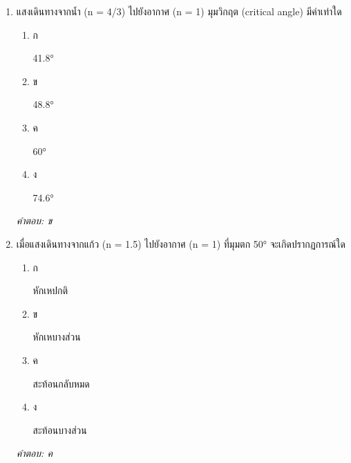 \documentclass[12pt]{article}
\begin{document}
\begin{enumerate}[label=\arabic*., itemsep=0.5\baselineskip, topsep=0.5\baselineskip, leftmargin=*]
\item แสงเดินทางจากน้ำ (n = 4/3) ไปยังอากาศ (n = 1) มุมวิกฤต (critical angle) มีค่าเท่าใด
\begin{enumerate}[label=\alph*)., itemsep=0.3\baselineskip, topsep=0.3\baselineskip]
\item ก\ 
\begin{minipage}[t]{0.9\linewidth}
\raggedright 41.8°
\end{minipage}
\item ข\ 
\begin{minipage}[t]{0.9\linewidth}
\raggedright 48.8°
\end{minipage}
\item ค\ 
\begin{minipage}[t]{0.9\linewidth}
\raggedright 60°
\end{minipage}
\item ง\ 
\begin{minipage}[t]{0.9\linewidth}
\raggedright 74.6°
\end{minipage}
\end{enumerate}
\vspace{-0.3\baselineskip}
\begin{small}
\textit{คำตอบ: ข}
\end{small}

\item เมื่อแสงเดินทางจากแก้ว (n = 1.5) ไปยังอากาศ (n = 1) ที่มุมตก 50° จะเกิดปรากฏการณ์ใด
\begin{enumerate}[label=\alph*)., itemsep=0.3\baselineskip, topsep=0.3\baselineskip]
\item ก\ 
\begin{minipage}[t]{0.9\linewidth}
\raggedright หักเหปกติ
\end{minipage}
\item ข\ 
\begin{minipage}[t]{0.9\linewidth}
\raggedright หักเหบางส่วน
\end{minipage}
\item ค\ 
\begin{minipage}[t]{0.9\linewidth}
\raggedright สะท้อนกลับหมด
\end{minipage}
\item ง\ 
\begin{minipage}[t]{0.9\linewidth}
\raggedright สะท้อนบางส่วน
\end{minipage}
\end{enumerate}
\vspace{-0.3\baselineskip}
\begin{small}
\textit{คำตอบ: ค}
\end{small}


\end{enumerate}
\end{document}
